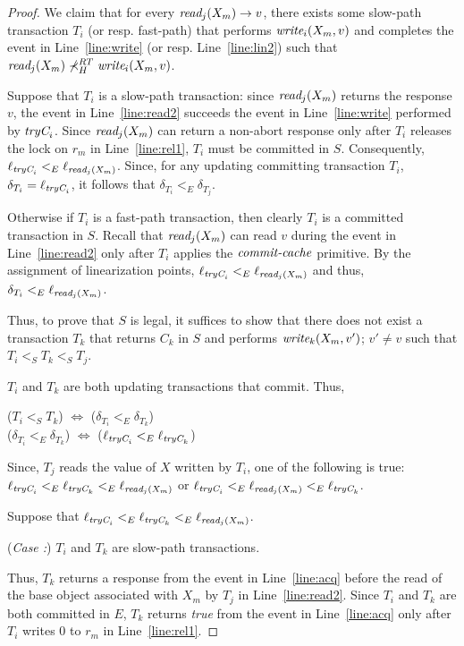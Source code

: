 \begin{proof}
%
We claim that for every $\textit{read}_j(X_m) \rightarrow v$, there exists some slow-path transaction $T_i$ (or resp. fast-path)
that performs $\textit{write}_i(X_m,v)$ and completes the event in Line~\ref{line:write} (or resp. Line~\ref{line:lin2}) such that
$\textit{read}_j(X_m) \not\prec_H^{RT} \textit{write}_i(X_m,v)$.

Suppose that $T_i$ is a slow-path transaction:
since $\textit{read}_j(X_m)$ returns the response $v$, the event in Line~\ref{line:read2}
succeeds the event in Line~\ref{line:write} performed by $\textit{tryC}_i$. 
Since $\textit{read}_j(X_m)$ can return a non-abort response only after $T_i$ releases the lock on $r_m$ in
Line~\ref{line:rel1}, $T_i$ must be committed in $S$.
Consequently,
$\ell_{\textit{tryC}_i} <_E \ell_{\textit{read}_j(X_m)}$.
Since, for any updating
committing transaction $T_i$, $\delta_{T_i}=\ell_{\textit{tryC}_i}$, it follows that
$\delta_{T_{i}} <_E \delta_{T_{j}}$.

Otherwise if $T_i$ is a fast-path transaction, then clearly $T_i$ is a committed transaction in $S$.
Recall that $\textit{read}_j(X_m)$ can read $v$ during the event in Line~\ref{line:read2}
only after $T_i$ applies the $\ms{commit-cache}$ primitive.
By the assignment of linearization points, 
$\ell_{\textit{tryC}_i} <_E \ell_{\textit{read}_j(X_m)}$ and thus, $\delta_{T_{i}} <_E \ell_{\textit{read}_j(X_m)}$.

Thus, to prove that $S$ is legal, it suffices to show that  
there does not exist a
transaction $T_k$ that returns $C_k$ in $S$ and performs $\textit{write}_k(X_m,v')$; $v'\neq v$ such that $T_i <_S T_k <_S T_j$. 
%

$T_i$ and $T_k$ are both updating transactions that commit. Thus, 
%
\begin{center}
($T_i <_S T_k$) $\Longleftrightarrow$ ($\delta_{T_i} <_{E} \delta_{T_k}$) \\
($\delta_{T_i} <_{E} \delta_{T_k}$) $\Longleftrightarrow$ ($\ell_{\textit{tryC}_i} <_{E} \ell_{\textit{tryC}_k}$) 
\end{center}
%
Since, $T_j$ reads the value of $X$ written by $T_i$, one of the following is true:
$\ell_{\textit{tryC}_i} <_{E} \ell_{\textit{tryC}_k} <_{E} \ell_{\textit{read}_j(X_m)}$ or
$\ell_{\textit{tryC}_i} <_{E} \ell_{\textit{read}_j(X_m)} <_{E} \ell_{\textit{tryC}_k}$.

Suppose that $\ell_{\textit{tryC}_i} <_{E} \ell_{\textit{tryC}_k} <_{E} \ell_{\textit{read}_j(X_m)}$.

(\textit{Case :}) $T_i$ and $T_k$ are slow-path transactions.

Thus, $T_k$ returns a response from the event in Line~\ref{line:acq} 
before the read of the base object associated with $X_m$ by $T_j$ in Line~\ref{line:read2}. 
Since $T_i$ and $T_k$ are both committed in $E$, $T_k$ returns \emph{true} from the event in
Line~\ref{line:acq} only after $T_i$ writes $0$ to $r_{m}$ in Line~\ref{line:rel1}.


\end{proof}
